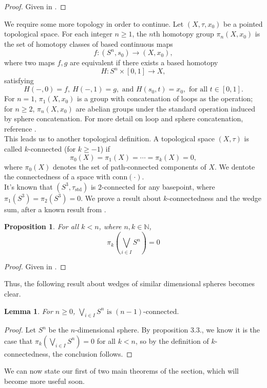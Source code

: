 \documentclass[12pt]{amsart}
\numberwithin{figure}{section}
\theoremstyle{plain}
\newtheorem{proposition}[theorem]{Proposition}
\newtheorem{lemma}[theorem]{Lemma}
\begin{document}
\begin{proof}
    Given in \cite{Adamaszek21}.
\end{proof}
\indent We require some more topology in order to continue. Let $(X, \tau, x_{0})$ be a pointed topological space. For each integer $n \geq 1$, the $n$th homotopy group $\pi_{n}(X, x_{0})$ is the set of homotopy classes of based continuous maps
\[f : (S^n, {s}_0) \to (X, x_{0}),\]
where two maps $f, g$ are equivalent if there exists a based homotopy
\[H : S^{n} \times [0,1] \to X,\]
satisfying
\[H(-,0) = f, \ H(-,1) = g, \text{ and } H(s_{0},t) = x_{0}, \text{ for all } t \in [0,1].\]
\indent For $n=1$, $\pi_1(X, x_{0})$ is a group with concatenation of loops as the operation; for $n \geq 2$, $\pi_n(X, x_{0})$ are abelian groups under the standard operation induced by sphere concatenation. For more detail on loop and sphere concatenation, reference \cite{Hatcher02}.\\
\indent This leads us to another topological definition. A topological space $(X, \tau)$ is called $k$-connected (for $k \geq -1$) if
\[\pi_0(X) = \pi_1(X) = \cdots = \pi_k(X) = 0,\]
where $\pi_{0}(X)$ denotes the set of path-connected components of $X$. We dentote the connectedness of a space with $\mathrm{conn}(\cdot)$.\\
\indent It's known that $(S^{3}, \tau_{\mathrm{std}})$ is $2$-connected for any basepoint, where $\pi_{1}(S^{3}) = \pi_{2}(S^{3}) = 0$. We prove a result about $k$-connectedness and the wedge sum, after a known result from \cite{Hilton1955}.
\begin{proposition}
    For all $k < n$, where $n,k\in\mathbb{N}$,
    \[\pi_{k}\left(\bigvee_{i\in I}S^{n}\right) = 0\]
\end{proposition}
\begin{proof}
    Given in \cite{Hilton1955}.
\end{proof}
\indent Thus, the following result about wedges of similar dimensional spheres becomes clear.
\begin{lemma}
    For $n\geq 0$, $\displaystyle\bigvee_{i\in I}S^{n} \text{ is } (n-1)\text{-connected.}$
\end{lemma}
\begin{proof}
    Let $S^{n}$ be the $n$-dimensional sphere. By proposition 3.3., we know it is the case that $\pi_{k}\left(\bigvee_{i\in I}S^{n} \right)= 0$ for all $k < n$, so by the definition of $k$-connectedness, the conclusion follows.
\end{proof}
\indent We can now state our first of two main theorems of the section, which will become more useful soon.
\end{document}
